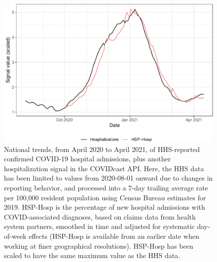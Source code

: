 \documentclass[9pt,twoside,lineno]{pnas-new}
\begin{document}
\begin{figure}

{\centering \includegraphics[width=\textwidth]{fig/hospitalization_time_trends_national-1} 

}

\caption{National trends, from April 2020 to April 2021, of HHS-reported confirmed COVID-19 hospital admissions, plus another hospitalization signal in the COVIDcast API. Here, the HHS data has been limited to values from 2020-08-01 onward due to changes in reporting behavior, and processed into a 7-day trailing average rate per 100,000 resident population using Census Bureau estimates for 2019. HSP-Hosp is the percentage of new hospital admissions with COVID-associated diagnoses, based on claims data from health system partners, smoothed in time and adjusted for systematic day-of-week effects (HSP-Hosp is available from an earlier date when working at finer geographical resolutions). HSP-Hosp has been scaled to have the same maximum value as the HHS data.}\label{fig:hospitalization_time_trends_national}
\end{figure}

\clearpage
\end{document}
